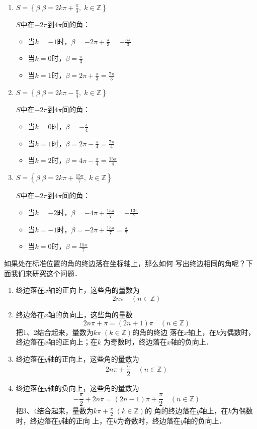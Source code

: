 \begin{solution}
\begin{enumerate}
    \item 
$S=\left\{\beta \Big|\beta =2k\pi+\frac{\pi}{3},\; k\in\mathbb{Z}\right\}$

$S$中在$-2\pi$到$4\pi$间的角：
\begin{itemize}
    \item 当$k=-1$时，$\beta =-2\pi+\frac{\pi}{3}=-\frac{5\pi}{3}$
    \item 当$k=0$时，$\beta=\frac{\pi}{3}$ 
    \item 当$k=1$时，$\beta =2\pi+\frac{\pi}{3}=\frac{7\pi}{3}$
\end{itemize}

\item $S=\left\{\beta \Big|\beta =2k\pi-\frac{\pi}{4},\;k\in\mathbb{Z}\right\}$

$S$中在$-2\pi$到$4\pi$间的角：
\begin{itemize}
    \item 当$k=0$时，$\beta =-\frac{\pi}{4}$
    \item 当$k=1$时，$\beta =2\pi-\frac{\pi}{4}=\frac{7\pi}{4}$
    \item 当$k=2$时，$\beta =4\pi-\frac{\pi}{4}=\frac{15\pi}{4}$
\end{itemize}

\item $S=\left\{\beta \Big|\beta =2k\pi+\frac{15\pi}{7},\; k\in\mathbb{Z}\right\}$

$S$中在$-2\pi$到$4\pi$间的角：
\begin{itemize}
    \item 当$k=-2$时，$\beta =-4\pi+\frac{15\pi}{7}=-\frac{13\pi}{7}$
    \item 当$k=-1$时，$\beta =-2\pi+\frac{15\pi}{7}=\frac{\pi}{7}$
    \item 当$k=0$时，$\beta=\frac{15\pi}{7}$
\end{itemize}
\end{enumerate}    
\end{solution}

如果处在标准位置的角的终边落在坐标轴上，那么如何
写出终边相同的角呢？下面我们来研究这个问题．

\begin{enumerate}
    \item 终边落在$x$轴的正向上，这些角的量数为
\[2n\pi\quad  (n\in\mathbb{Z})\]
\item 终边落在$x$轴的负向上，这些角的量数
\[2n\pi +\pi =(2n+1)\pi\quad  (n\in\mathbb{Z})\]
把1、2结合起来，量数为$k\pi\;  (k\in\mathbb{Z})$的角的终边
落在$x$轴上，在$k$为偶数时，终边落在$x$轴的正向上；在$k$
为奇数时，终边落在$x$轴的负向上．
\item 终边落在$y$轴的正向上，这些角的量数为
\[2n\pi +\frac{\pi}{2}\quad (n\in\mathbb{Z})\]
\item 终边落在$y$轴的负向上，这些角的量数为
\[-\frac{\pi}{2}+2n\pi=(2n-1)\pi +\frac{\pi}{2}\quad (n\in\mathbb{Z})\]
把3、4结合起来，量数为$k\pi +\frac{\pi}{2}\; (k\in\mathbb{Z})$的
角的终边落在$y$轴上，在$k$为偶数时，终边落在$y$轴的正向
上，在$k$为奇数时，终边落在$y$轴的负向上．
\end{enumerate}

